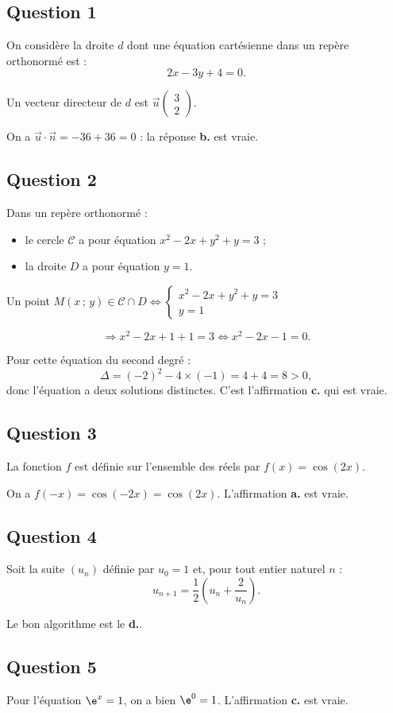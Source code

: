 \subsection*{Question 1}

On considère la droite \(d\) dont une équation cartésienne dans un repère orthonormé est :
\[
2x - 3y + 4 = 0.
\]

Un vecteur directeur de \(d\) est \(\vec{u} \begin{pmatrix} 3 \\ 2 \end{pmatrix}\).

On a \(\vec{u} \cdot \overrightarrow{n} = -36 + 36 = 0\) : la réponse \textbf{b.} est vraie.

\subsection*{Question 2}

Dans un repère orthonormé :
\begin{itemize}
    \item le cercle \(\mathcal{C}\) a pour équation \(x^2 - 2x + y^2 + y = 3\) ;
    \item la droite \(D\) a pour équation \(y = 1\).
\end{itemize}

Un point \(M(x\,;\,y) \in \mathcal{C} \cap D \iff \left\{
\begin{array}{l}
x^2 - 2x + y^2 + y = 3 \\
y = 1
\end{array} \right.\)

\[
\Rightarrow x^2 - 2x + 1 + 1 = 3 \iff x^2 - 2x - 1 = 0.
\]

Pour cette équation du second degré :
\[
\Delta = (-2)^2 - 4 \times (-1) = 4 + 4 = 8 > 0,
\]
donc l'équation a deux solutions distinctes. C'est l'affirmation \textbf{c.} qui est vraie.

\subsection*{Question 3}

La fonction \(f\) est définie sur l'ensemble des réels par \(f(x) = \cos(2x)\).

On a \(f(-x) = \cos(-2x) = \cos(2x)\). L'affirmation \textbf{a.} est vraie.

\subsection*{Question 4}

Soit la suite \((u_n)\) définie par \(u_0 = 1\) et, pour tout entier naturel \(n\) :
\[
u_{n+1} = \dfrac{1}{2} \left( u_n + \dfrac{2}{u_n} \right).
\]

Le bon algorithme est le \textbf{d.}.

\subsection*{Question 5}

Pour l'équation \(\e^x = 1\), on a bien \(\e^0 = 1\). L'affirmation \textbf{c.} est vraie.
